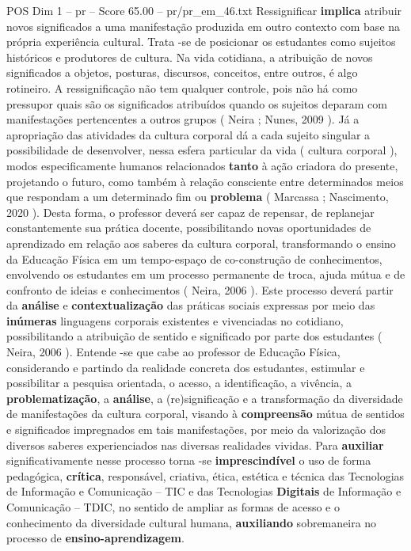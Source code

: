 \begin{textsample}{POS Dim 1 – pr – Score 65.00 – pr/pr\_em\_46.txt}
Ressignificar \textbf{implica} atribuir novos significados a uma manifestação produzida em outro contexto com base na própria experiência cultural.
Trata -se de posicionar os estudantes como sujeitos históricos e produtores de cultura.
Na vida cotidiana, a atribuição de novos significados a objetos, posturas, discursos, conceitos, entre outros, é algo rotineiro.
A ressignificação não tem qualquer controle, pois não há como pressupor quais são os significados atribuídos quando os sujeitos deparam com manifestações pertencentes a outros grupos ( Neira ; Nunes, 2009 ).
Já a apropriação das atividades da cultura corporal dá a cada sujeito singular a possibilidade de desenvolver, nessa esfera particular da vida ( cultura corporal ), modos especificamente humanos relacionados \textbf{tanto} à ação criadora do presente, projetando o futuro, como também à relação consciente entre determinados meios que respondam a um determinado fim ou \textbf{problema} ( Marcassa ; Nascimento, 2020 ).
Desta forma, o professor deverá ser capaz de repensar, de replanejar constantemente sua prática docente, possibilitando novas oportunidades de aprendizado em relação aos saberes da cultura corporal, transformando o ensino da Educação Física em um tempo-espaço de co-construção de conhecimentos, envolvendo os estudantes em um processo permanente de troca, ajuda mútua e de confronto de ideias e conhecimentos ( Neira, 2006 ).
Este processo deverá partir da \textbf{análise} e \textbf{contextualização} das práticas sociais expressas por meio das \textbf{inúmeras} linguagens corporais existentes e vivenciadas no cotidiano, possibilitando a atribuição de sentido e significado por parte dos estudantes ( Neira, 2006 ).
Entende -se que cabe ao professor de Educação Física, considerando e partindo da realidade concreta dos estudantes, estimular e possibilitar a pesquisa orientada, o acesso, a identificação, a vivência, a \textbf{problematização}, a \textbf{análise}, a (re)significação e a transformação da diversidade de manifestações da cultura corporal, visando à \textbf{compreensão} mútua de sentidos e significados impregnados em tais manifestações, por meio da valorização dos diversos saberes experienciados nas diversas realidades vividas.
Para \textbf{auxiliar} significativamente nesse processo torna -se \textbf{imprescindível} o uso de forma pedagógica, \textbf{crítica}, responsável, criativa, ética, estética e técnica das Tecnologias de Informação e Comunicação – TIC e das Tecnologias \textbf{Digitais} de Informação e Comunicação – TDIC, no sentido de ampliar as formas de acesso e o conhecimento da diversidade cultural humana, \textbf{auxiliando} sobremaneira no processo de \textbf{ensino-aprendizagem}.

\end{textsample}

